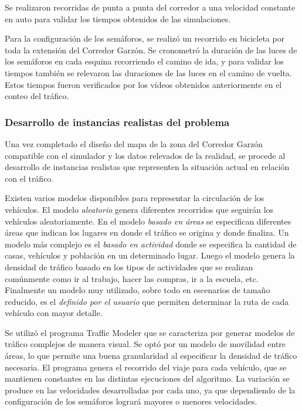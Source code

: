 Se realizaron recorridas de punta a punta del corredor a una velocidad constante en auto para validar los tiempos obtenidos de las simulaciones.

Para la configuración de los semáforos, se realizó un recorrido en bicicleta por toda la extensión del Corredor Garzón. Se cronometró la duración de las luces de los semáforos en cada esquina recorriendo el camino de ida, y para validar los tiempos también se relevaron las duraciones de las luces en el camino de vuelta. Estos tiempos fueron verificados por los vídeos obtenidos anteriormente en el conteo del tráfico.


\subsubsection{Desarrollo de instancias realistas del problema}

Una vez completado el diseño del mapa de la zona del Corredor Garzón compatible con el simulador y los datos relevados de la realidad, se procede al desarrollo de instancias realistas que representen la situación actual en relación con el tráfico.

Existen varios modelos disponibles para representar la circulación de los vehículos. El modelo \emph{aleatorio} genera diferentes recorridos que seguirán los vehículos aleatoriamente. En el modelo \emph{basado en áreas} se especifican diferentes áreas que indican los lugares en donde el tráfico se origina y donde finaliza. Un modelo más complejo es el \emph{basado en actividad} donde se especifica la cantidad de casas, vehículos y población en un determinado lugar. Luego el modelo genera la densidad de tráfico basado en los tipos de actividades que se realizan comúnmente como ir al trabajo, hacer las compras, ir a la escuela, etc. Finalmente un modelo muy utilizado, sobre todo en escenarios de tamaño reducido, es el \emph{definido por el usuario} que permiten determinar la ruta de cada vehículo con mayor detalle.

Se utilizó el programa Traffic Modeler \citep{TrafficModeler} que se caracteriza por generar modelos de tráfico complejos de manera visual. Se optó por un modelo de movilidad entre áreas, lo que permite una buena granularidad al especificar la densidad de tráfico necesaria. El programa genera el recorrido del viaje para cada vehículo, que se mantienen constantes en las distintas ejecuciones del algoritmo. La variación se produce en las velocidades desarrolladas por cada uno, ya que dependiendo de la configuración de los semáforos logrará mayores o menores velocidades.



